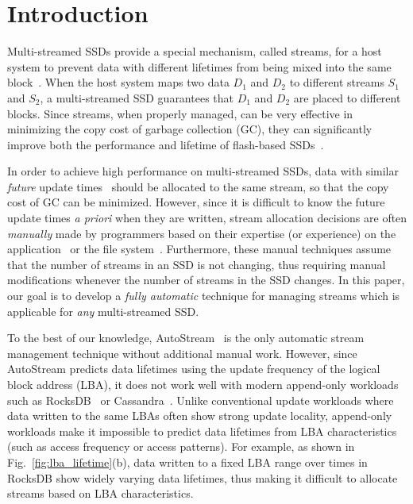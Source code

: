 \vspace{-12pt}
\section{Introduction}
\label{sec:intro}
\vspace{-5pt}
Multi-streamed SSDs provide a special mechanism,
called streams, for a host system to prevent data with different lifetimes 
from being mixed into the same block~\cite{T10, MultiStream}.
When the host system maps two data $D_1$ and $D_2$ to 
different streams $S_1$ and $S_2$, a multi-streamed SSD guarantees that 
$D_1$ and $D_2$ are placed to different blocks.   
Since streams, when properly managed, can be very effective in minimizing 
the copy cost of garbage collection (GC), they
can significantly improve both the performance and lifetime of 
flash-based SSDs~\cite{MultiStream, Level, FStream, AutoStream}.

In order to achieve high performance on multi-streamed SSDs, data with similar 
{\it future} update times~\cite{PCHa}
should be allocated 
to the same stream, so that the copy cost of GC can be minimized.
However, since it is difficult to know the future update times {\it a priori} when they are written,
stream allocation decisions are often {\it manually} made 
by programmers based on their expertise (or experience) 
on the application~\cite{MultiStream, Level} or the file system~\cite{FStream}.  
Furthermore, these manual techniques assume 
that the number of streams in an SSD is not changing, 
thus requiring manual modifications whenever the number of streams in the SSD changes.
In this paper, our goal is to develop 
a {\it fully automatic} technique for managing streams 
which is applicable for {\it any} multi-streamed SSD.

To the best of our knowledge, \textsf{\small AutoStream}~\cite{AutoStream} is the only automatic 
stream management technique
without additional manual work.  
However, since \textsf{\small AutoStream} predicts data lifetimes using the update frequency 
of the logical block address (LBA), it does not work well with modern append-only workloads 
such as RocksDB~\cite{RocksDB} or Cassandra~\cite{Cassandra}.  
Unlike conventional update workloads where data written to the same LBAs 
often show strong update locality, 
append-only workloads make it impossible to predict data lifetimes 
from LBA characteristics (such as access frequency or access patterns).  
For example, as shown in Fig.~\ref{fig:lba_lifetime}(b), 
data written to a fixed LBA range over times in RocksDB 
show widely varying data lifetimes, 
thus making it difficult to allocate streams based on LBA characteristics.

